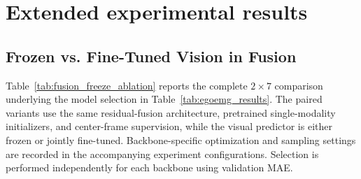 \documentclass[letterpaper]{article} %
\begin{document}
\FloatBarrier
\section{Extended experimental results}
\label{app:extended_results}

\subsection{Frozen vs. Fine-Tuned Vision in Fusion}
\label{app:fusion_freeze_ablation}

Table~\ref{tab:fusion_freeze_ablation} reports the complete $2\times7$
comparison underlying the model selection in Table~\ref{tab:egoemg_results}.
The paired variants use the same residual-fusion architecture, pretrained
single-modality initializers, and center-frame supervision, while the visual
predictor is either frozen or jointly fine-tuned. Backbone-specific optimization
and sampling settings are recorded in the accompanying experiment configurations.
Selection is performed independently for each backbone using validation MAE.
\end{document}
